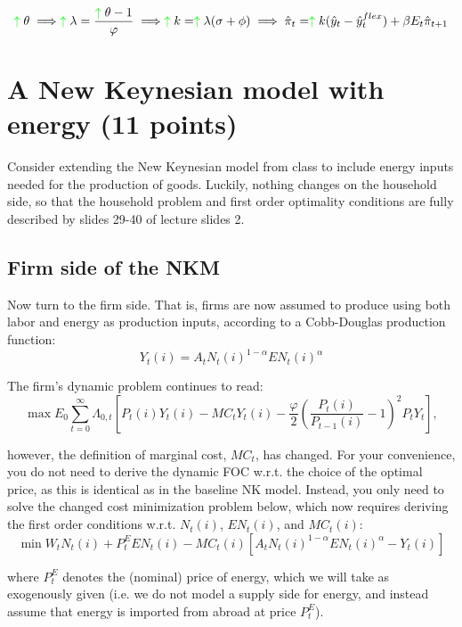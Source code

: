 \documentclass[a4paper,11pt]{article}
\newcommand{\pos}{\color{green} \uparrow \color{black}}
\begin{document}
$$\pos \theta \implies \pos\lambda = \frac{\pos \theta-1}{\varphi} \implies \pos k = \pos \lambda (\sigma + \phi) \implies \hat{\pi}_t = \pos k(\hat{y}_t-\hat{y}_t^{flex})+\beta E_t \hat{\pi}_{t+1}$$


\pagebreak

\section{A New Keynesian model with energy (11 points)}
Consider extending the New Keynesian model from class to include energy inputs needed for the production of goods. Luckily, nothing changes on the household side, so that the household problem and first order optimality conditions are fully described by slides 29-40 of lecture slides 2.
\begin{qbox}{\subsection{Firm side of the NKM}}
Now turn to the firm side. That is, firms are now assumed to produce using both labor and energy as production inputs, according to a Cobb-Douglas production function:
\begin{equation}
    Y_t(i) = A_tN_t(i)^{1-\alpha}EN_t(i)^\alpha
\end{equation}

The firm's dynamic problem continues to read:
\begin{equation}
    \max E_0\sum_{t=0}^\infty \Lambda_{0,t} \left[ P_t(i) Y_t(i) -MC_tY_t(i) - \frac{\varphi}{2}\left( \frac{P_t(i)}{P_{t-1}(i)}-1\right)^2P_tY_t\right],
\end{equation}

however, the definition of marginal cost, $MC_t$, has changed. For your convenience, you do not need to derive the dynamic FOC w.r.t. the choice of the optimal price, as this is identical as in the baseline NK model. Instead, you only need to solve the changed cost minimization problem below, which now requires deriving the first order conditions w.r.t. $N_t(i)$, $EN_t(i)$, and $MC_t(i)$:
\begin{equation}
    \min W_tN_t(i) + P_t^E EN_t(i) - MC_t(i)\left[ A_tN_t(i)^{1-\alpha}EN_t(i)^\alpha-Y_t(i)\right]
\end{equation}

where $P^E_t$ denotes the (nominal) price of energy, which we will take as exogenously given (i.e. we do not model a supply side for energy, and instead assume that energy is imported from abroad at price $P^E_t$).\\


\end{qbox}
\end{document}
